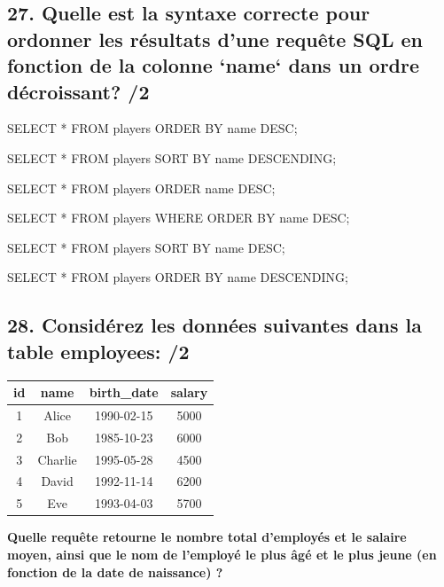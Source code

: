 \documentclass[12pt,a4paper]{article}
\begin{document}
\begin{flushleft}
\subsection*{27. Quelle est la syntaxe correcte pour ordonner les résultats d'une requête SQL en fonction de la colonne `name` dans un ordre décroissant? /2}
\begin{choices}
    \item SELECT * FROM players ORDER BY name DESC;
    \item SELECT * FROM players SORT BY name DESCENDING;
    \item SELECT * FROM players ORDER name DESC;
    \item SELECT * FROM players WHERE ORDER BY name DESC;
    \item SELECT * FROM players SORT BY name DESC;
    \item SELECT * FROM players ORDER BY name DESCENDING;
\end{choices}

\newpage
\subsection*{28. Considérez les données suivantes dans la table employees: /2}

\begin{table}[h]
    \centering
    \begin{tabular}{|c|c|c|c|}
    \hline
    \textbf{id} & \textbf{name} & \textbf{birth\_date} & \textbf{salary} \\
    \hline
    1 & Alice & 1990-02-15 & 5000 \\
    2 & Bob & 1985-10-23 & 6000 \\
    3 & Charlie & 1995-05-28 & 4500 \\
    4 & David & 1992-11-14 & 6200 \\
    5 & Eve & 1993-04-03 & 5700 \\
    \hline
    \end{tabular}
\end{table}


\textbf{Quelle requête retourne le nombre total d'employés et le salaire moyen, ainsi que le nom de l'employé le plus âgé et le plus jeune (en fonction de la date de naissance) ?}


\end{flushleft}
\end{document}
